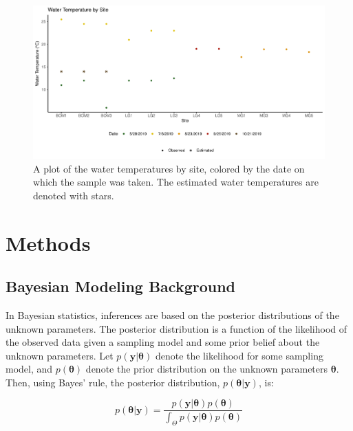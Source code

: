 \documentclass[12pt]{article}\usepackage[]{graphicx}\usepackage[]{color}
\makeatletter
\def\maxwidth{ %
  \ifdim\Gin@nat@width>\linewidth
    \linewidth
  \else
    \Gin@nat@width
  \fi
}
\newenvironment{knitrout}{}{} %
\def\maxwidth{ %
  \ifdim\Gin@nat@width>\linewidth
    \linewidth
  \else
    \Gin@nat@width
  \fi
}
\newenvironment{knitrout}{}{} %
\makeatother
\begin{document}
\begin{figure}[]
\begin{knitrout}
\color{fgcolor}

{\centering \includegraphics[width=\maxwidth]{figure/eDNA_visualization_temp-1} 

}



\end{knitrout}
\caption{A plot of the water temperatures by site, colored by the date on which the sample was taken. The estimated water temperatures are denoted with stars.}
\label{fig:eDNA_temp}
\end{figure}

\section{Methods}

\subsection{Bayesian Modeling Background}

In Bayesian statistics, inferences are based on the posterior distributions of the unknown parameters. The posterior distribution is a function of the likelihood of the observed data given a sampling model and some prior belief about the unknown parameters. Let $p(\bm{y}|\bm{\theta})$ denote the likelihood for some sampling model, and $p(\bm{\theta})$ denote the prior distribution on the unknown parameters $\bm{\theta}$. Then, using Bayes' rule, the posterior distribution, $p(\bm{\theta}|\bm{y})$, is: 

$$p(\bm{\theta}|\bm{y}) = \frac{p(\bm{y}|\bm{\theta})p(\bm{\theta})}{\int_\Theta p(\bm{y}|\bm{\theta})p(\bm{\theta})}$$
\end{document}
